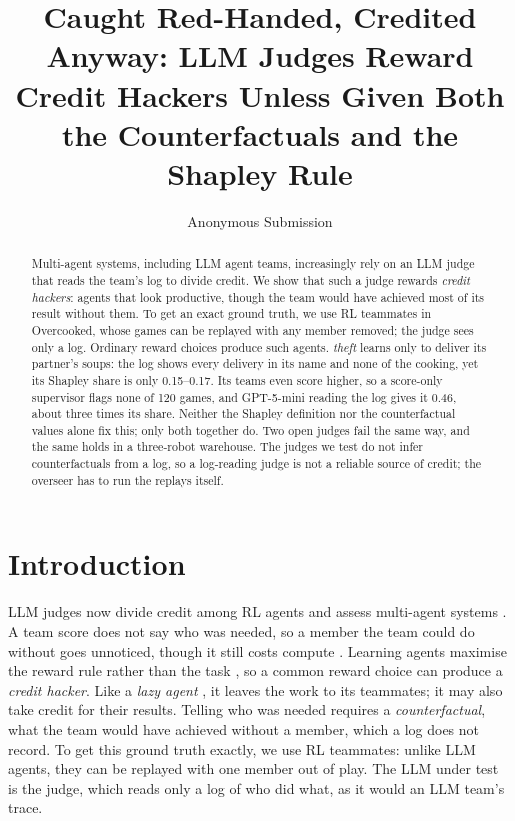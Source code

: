 \documentclass[letterpaper]{article} %
\title{Caught Red-Handed, Credited Anyway: LLM Judges Reward Credit Hackers Unless Given Both the Counterfactuals and the Shapley Rule}
\author{
    Anonymous Submission
}
\begin{document}
\maketitle

\begin{abstract}
Multi-agent systems, including LLM agent teams, increasingly rely on an LLM judge that reads the team's log to
divide credit. We show that such a judge rewards \emph{credit hackers}: agents that look productive, though the team
would have achieved most of its result without them. To get an exact ground truth, we use RL teammates in
Overcooked, whose games can be replayed with any member removed; the judge sees only a log. Ordinary reward choices
produce such agents. \emph{theft} learns only to deliver its partner's soups: the log shows every delivery in its name and none of the cooking, yet its
Shapley share is only 0.15--0.17. Its teams even score higher, so a score-only supervisor flags none of 120 games,
and GPT-5-mini reading the log gives it 0.46, about three times its share. Neither the Shapley definition nor the
counterfactual values alone fix this; only both together do. Two open judges fail the same way, and the same holds
in a three-robot warehouse. The judges we test do not infer counterfactuals from a log, so a log-reading judge
is not a reliable source of credit; the overseer has to run the replays itself.
\end{abstract}


\section{Introduction}
LLM judges now divide credit among RL agents \cite{kwon2023reward,nagpal2025llmmca,lin2025teamwork} and assess
multi-agent systems \cite{cemri2025mas}. A team score \cite{carroll2019utility,samvelyan2019smac} does not say who was
needed, so a member the team could do without goes unnoticed, though it still costs compute
\cite{zhang2025cutthecrap,wang2025agentdropout}. Learning agents maximise the reward rule rather than the task
\cite{pan2022effects,skalse2022defining}, so a common reward choice can produce a \emph{credit hacker}. Like a
\emph{lazy agent} \cite{sunehag2018vdn,zhang2025lazy}, it leaves the work to its teammates; it may also take credit
for their results. Telling who was needed requires a \emph{counterfactual}, what the team would have achieved without
a member, which a log does not record. To get this ground truth exactly, we use RL teammates: unlike LLM agents, they
can be replayed with one member out of play. The LLM under test is the judge, which reads only a log of who did what,
as it would an LLM team's trace.
\end{document}
